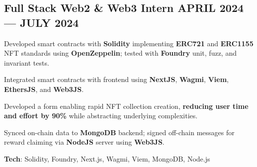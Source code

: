 \documentclass[letter,10pt]{article}
\begin{document}
\subsection{{Full Stack Web2 \& Web3 Intern \hfill APRIL 2024 --- JULY 2024}}
\begin{zitemize}
  \item Developed smart contracts with \textbf{Solidity} implementing \textbf{ERC721} and \textbf{ERC1155} NFT standards using \textbf{OpenZeppelin}; tested with \textbf{Foundry} unit, fuzz, and invariant tests.
  \item Integrated smart contracts with frontend using \textbf{NextJS}, \textbf{Wagmi}, \textbf{Viem}, \textbf{EthersJS}, and \textbf{Web3JS}.
  \item Developed a form enabling rapid NFT collection creation, \textbf{reducing user time and effort by 90\%} while abstracting underlying complexities.
  \item Synced on-chain data to \textbf{MongoDB} backend; signed off-chain messages for reward claiming via \textbf{NodeJS} server using \textbf{Web3JS}.
  \item \textbf{Tech}: Solidity, Foundry, Next.js, Wagmi, Viem, MongoDB, Node.js
\end{zitemize}
\end{document}
